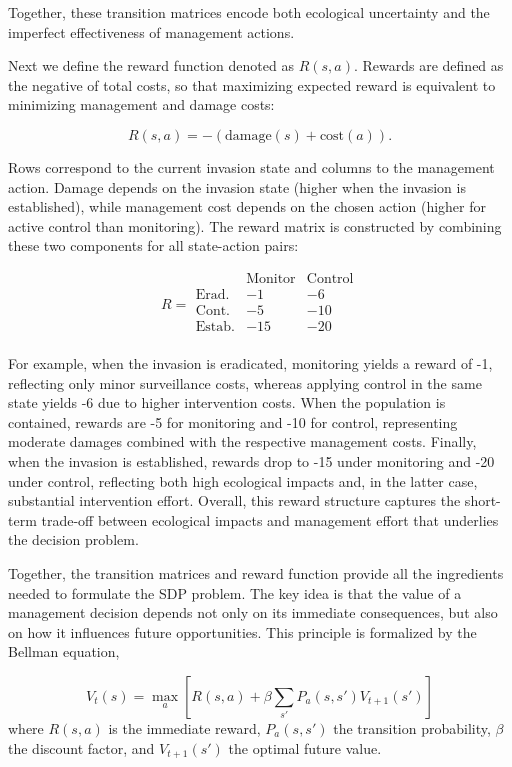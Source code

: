 \documentclass[
  11pt,
  a4paper,
]{article}
\begin{document}
Together, these transition matrices encode both ecological uncertainty and the imperfect effectiveness of management actions.

Next we define the reward function denoted as \(R(s,a)\). Rewards are defined as the negative of total costs, so that maximizing expected reward is equivalent to minimizing management and damage costs:

\[
R(s,a) = -(\text{damage}(s) + \text{cost}(a)).
\]

Rows correspond to the current invasion state and columns to the management action. Damage depends on the invasion state (higher when the invasion is established), while management cost depends on the chosen action (higher for active control than monitoring). The reward matrix is constructed by combining these two components for all state-action pairs:

\[
R =
\begin{array}{c|cc}
 & \text{Monitor} & \text{Control} \\
\hline
\text{Erad.} & -1  & -6  \\
\text{Cont.} & -5  & -10 \\
\text{Estab.} & -15 & -20 \\
\end{array}
\]

For example, when the invasion is eradicated, monitoring yields a reward of -1, reflecting only minor surveillance costs, whereas applying control in the same state yields -6 due to higher intervention costs. When the population is contained, rewards are -5 for monitoring and -10 for control, representing moderate damages combined with the respective management costs. Finally, when the invasion is established, rewards drop to -15 under monitoring and -20 under control, reflecting both high ecological impacts and, in the latter case, substantial intervention effort. Overall, this reward structure captures the short-term trade-off between ecological impacts and management effort that underlies the decision problem.

Together, the transition matrices and reward function provide all the ingredients needed to formulate the SDP problem. The key idea is that the value of a management decision depends not only on its immediate consequences, but also on how it influences future opportunities. This principle is formalized by the Bellman equation,

\[V_t(s) = \max_a\left[R(s,a)+\beta\sum_{s'}P_a(s,s')V_{t+1}(s')\right]\]
where \(R(s,a)\) is the immediate reward, \(P_a(s,s')\) the transition probability, \(\beta\) the discount factor, and \(V_{t+1}(s')\) the optimal future value.
\end{document}
